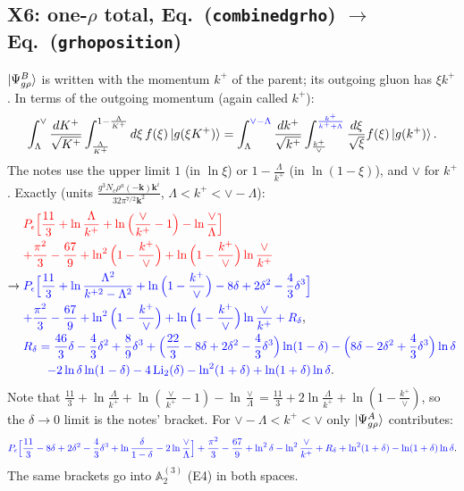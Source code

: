 \documentclass[10pt]{article}
\def\mf#1{\mathbb{#1}}
\def\v#1{\mathbf{#1}}
\newcommand{\old}[1]{{\color{red}#1}}
\newcommand{\new}[1]{{\color{blue}#1}}
\newcommand{\eqn}[1]{Eq.~(\texttt{#1})}
\newcommand{\Li}{\mathrm{Li}_2}
\begin{document}
\subsection{X6: one-$\rho$ total, \eqn{combinedgrho} $\to$ \eqn{grhoposition}}\label{sec:X6}
$\ket{\Psi^B_{g\rho}}$ is written with the momentum $k^+$ of the parent; its outgoing gluon has $\xi k^+$. In terms of the outgoing momentum (again called $k^+$):
\begin{equation}
\int_\Lambda^\vee\frac{dK^+}{\sqrt{K^+}}\int_{\frac{\Lambda}{K^+}}^{1-\frac{\Lambda}{K^+}}d\xi\,f(\xi)\ket{g(\xi K^+)}=\int_\Lambda^{\new{\vee-\Lambda}}\frac{dk^+}{\sqrt{k^+}}\int_{\frac{k^+}{\vee}}^{\new{\frac{k^+}{k^++\Lambda}}}\frac{d\xi}{\sqrt\xi}f(\xi)\ket{g(k^+)}.
\end{equation}
The notes use the upper limit $1$ (in $\ln\xi$) or $1-\frac\Lambda{k^+}$ (in $\ln(1-\xi)$), and $\vee$ for $k^+$. Exactly (units $\frac{g^3N_c\rho^a(-\v k)\v k^i}{32\pi^{7/2}\v k^2}$, $\Lambda<k^+<\vee-\Lambda$):
\begin{align}
&\old{P_\epsilon\Big[\frac{11}{3}+\ln\frac{\Lambda}{k^+}+\ln\Big(\frac{\vee}{k^+}-1\Big)-\ln\frac{\vee}{\Lambda}\Big]}\notag\\
&\old{+\frac{\pi^2}{3}-\frac{67}{9}+\ln^2\Big(1-\frac{k^+}{\vee}\Big)+\ln\Big(1-\frac{k^+}{\vee}\Big)\ln\frac{\vee}{k^+}}\notag\\
\to{}&\new{P_\epsilon\Big[\frac{11}{3}+\ln\frac{\Lambda^2}{k^{+2}-\Lambda^2}+\ln\Big(1-\frac{k^+}{\vee}\Big)-8\delta+2\delta^2-\frac43\delta^3\Big]}\notag\\
&\new{+\frac{\pi^2}{3}-\frac{67}{9}+\ln^2\Big(1-\frac{k^+}{\vee}\Big)+\ln\Big(1-\frac{k^+}{\vee}\Big)\ln\frac{\vee}{k^+}+R_\delta},\\
&\new{R_\delta=\frac{46}{3}\delta-\frac43\delta^2+\frac89\delta^3+\Big(\frac{22}{3}-8\delta+2\delta^2-\frac43\delta^3\Big)\ln(1-\delta)-\Big(8\delta-2\delta^2+\frac43\delta^3\Big)\ln\delta}\notag\\
&\qquad\new{-2\ln\delta\ln(1-\delta)-4\,\Li(\delta)-\ln^2(1+\delta)+\ln(1+\delta)\ln\delta}.
\end{align}
Note that $\frac{11}{3}+\ln\frac{\Lambda}{k^+}+\ln(\frac{\vee}{k^+}-1)-\ln\frac\vee\Lambda=\frac{11}{3}+2\ln\frac{\Lambda}{k^+}+\ln(1-\frac{k^+}{\vee})$, so the $\delta\to0$ limit is the notes' bracket. For $\vee-\Lambda<k^+<\vee$ only $\ket{\Psi^A_{g\rho}}$ contributes:
\begin{equation}
\new{P_\epsilon\Big[\frac{11}{3}-8\delta+2\delta^2-\frac43\delta^3+\ln\frac{\delta}{1-\delta}-2\ln\frac{\vee}{\Lambda}\Big]+\frac{\pi^2}{3}-\frac{67}{9}+\ln^2\delta-\ln^2\frac{\vee}{k^+}+R_\delta+\ln^2(1+\delta)-\ln(1+\delta)\ln\delta}.
\end{equation}
The same brackets go into $\mf A^{(3)}_2$ (E4) in both spaces.
\end{document}
